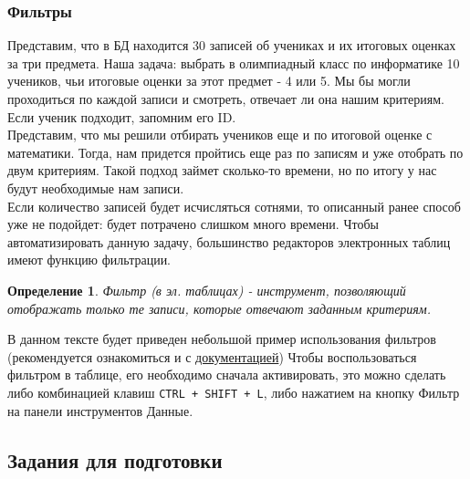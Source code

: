 \documentclass[12pt]{article}
\newtheorem{definition}{Определение}[section]
\theoremstyle{problem_style}
\begin{document}
\subsubsection{Фильтры}
Представим, что в БД находится 30 записей об учениках и их итоговых оценках за три предмета. Наша задача: выбрать в олимпиадный класс по информатике 10 учеников, чьи итоговые оценки за этот предмет - 4 или 5. Мы бы могли проходиться по каждой записи и смотреть, отвечает ли она нашим критериям. Если ученик подходит, запомним его ID.\\
Представим, что мы решили отбирать учеников еще и по итоговой оценке с математики. Тогда, нам придется пройтись еще раз по записям и уже отобрать по двум критериям. Такой подход займет сколько-то времени, но по итогу у нас будут необходимые нам записи.\\
Если количество записей будет исчисляться сотнями, то описанный ранее способ уже не подойдет: будет потрачено слишком много времени. Чтобы автоматизировать данную задачу, большинство редакторов электронных таблиц имеют функцию фильтрации.
\begin{definition}
Фильтр (в эл. таблицах) - инструмент, позволяющий отображать только те записи, которые отвечают заданным критериям.
\end{definition}
В данном тексте будет приведен небольшой пример использования фильтров (рекомендуется ознакомиться и с \href{https://support.microsoft.com/ru-ru/office/%D1%84%D0%B8%D0%BB%D1%8C%D1%82%D1%80%D0%B0%D1%86%D0%B8%D1%8F-%D0%B4%D0%B0%D0%BD%D0%BD%D1%8B%D1%85-%D0%B2-%D0%B4%D0%B8%D0%B0%D0%BF%D0%B0%D0%B7%D0%BE%D0%BD%D0%B5-%D0%B8%D0%BB%D0%B8-%D1%82%D0%B0%D0%B1%D0%BB%D0%B8%D1%86%D0%B5-7fbe34f4-8382-431d-942e-41e9a88f6a96}{документацией})
Чтобы воспользоваться фильтром в таблице, его необходимо сначала активировать, это можно сделать либо комбинацией клавиш \texttt{CTRL + SHIFT + L}, либо нажатием на кнопку Фильтр на панели инструментов Данные.
\subsection{Задания для подготовки}
\newcommand\PThreeSource{./3\_problems}
\newcommand{\fileref}[1]{\href{run:\PThreeSource/#1}{\texttt{#1}}}
\end{document}
